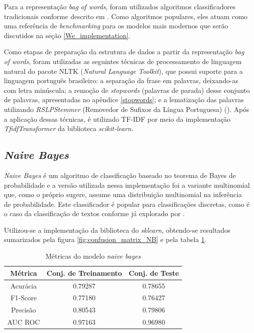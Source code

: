 Para a representação \textit{bag of words}, foram utilizados algoritmos classificadores tradicionais conforme descrito em \cite{InformationRetrievalBook}. Como algoritmos populares, eles atuam como uma referência de \textit{benchmarking} para os modelos mais modernos que serão discutidos na seção \ref{We_implementation}.

Como etapas de preparação da estrutura de dados a partir da representação \textit{bag of words}, foram utilizadas as seguintes técnicas de processamento de linguagem natural do pacote NLTK (\textit{Natural Language Toolkit}), que possui suporte para a linguagem português brasileiro: a separação da frase em palavras, deixando-as com letra minúscula; a remoção de \textit{stopwords} (palavras de parada) desse conjunto de palavras, apresentadas no apêndice \ref{stopwords}; e a lematização das palavras utilizando \textit{RSLPStemmer} (Removedor de Sufixos da Língua Portuguesa) (\cite{RSLPStemmer}). Após a aplicação dessas técnicas, é utilizado TF-IDF por meio da implementação \textit{TfidfTransformer} da biblioteca \textit{scikit-learn}.

\subsection{\textit{Naive Bayes}}

\textit{Naive Bayes} é um algoritmo de classificação baseado no teorema de Bayes de probabilidade e a versão utilizada nessa implementação foi a variante multinomial que, como o próprio sugere, assume uma distribuição multinomial na inferência de probabilidade. Este classificador é popular para classificações discretas, como é o caso da classificação de textos conforme já explorado por \cite{McCallum98acomparison}.

Utilizou-se a implementação da biblioteca do \textit{sklearn}, obtendo-se resultados sumarizados pela figura \ref{fig:confusion_matrix_NB} e pela tabela \ref{tab:NB}.

\begin{table}[ht]
\centering
\caption{Métricas do modelo \textit{naive bayes}}
\vspace{0.5cm}
\begin{tabular}{c|c|c}
 
Métrica & Conj. de Treinamento & Conj. de Teste \\
\hline
Acurácia & 0.79287 & 0.78655 \\
F1-Score & 0.77180 & 0.76427 \\
Precisão & 0.80543 & 0.79806 \\
AUC ROC  & 0.97163 & 0.96980
\end{tabular}
\label{tab:NB}
\end{table}

